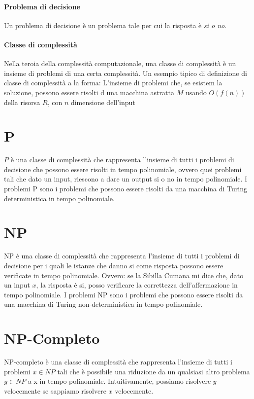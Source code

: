 \documentclass[12pt, a4paper, openany]{book}
\begin{document}
	\paragraph*{Problema di decisione}
	Un problema di decisione è un problema tale per cui la risposta è \emph{si o no}.
	\paragraph*{Classe di complessità}
	Nella teroia della complessità computazionale, una classe di complessità è un insieme di problemi di una certa complessità.
	Un esempio tipico di definizione di classe di complessità a la forma:
	L'insieme di problemi che, se esistem la soluzione, possono essere risolti d una macchina astratta $M$ usando $O(f(n))$ della risorsa $R$, con $n$ dimensione dell'input
	\section{P}
$P$ è una classe di complessità che rappresenta l'insieme di tutti i problemi di decisione che possono essere risolti in tempo polinomiale, ovvero quei problemi tali che dato un input, riescono a dare un output si o no in tempo polinomiale.
	I problemi P sono i problemi che possono essere risolti da una macchina di Turing deterministica in tempo polinomiale.
	\section{NP}
	NP è una classe di complessità che rappresenta l'insieme di tutti i problemi di decisione per i quali le istanze che danno si come risposta possono essere verificate in tempo polinomiale.
	Ovvero: se la Sibilla Cumana mi dice che, dato un input $x$, la risposta è si, posso verificare la correttezza dell'affermazione in tempo polinomiale.
	I problemi NP sono i problemi che possono essere risolti da una macchina di Turing non-deterministica in tempo polinomiale.
	\section{NP-Completo}
	NP-completo è una classe di complessità che rappresenta l'insieme di tutti i problemi $x\in NP$ tali che è possibile una riduzione da un qualsiasi altro problema $y \in NP$ a x in tempo polinomiale.
	Intuitivamente, possiamo risolvere $y$ velocemente se sappiamo risolvere $x$ velocemente.
\end{document}
